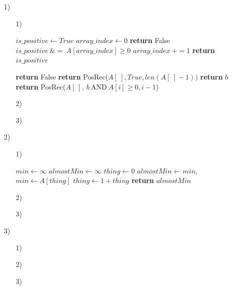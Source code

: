 \documentclass[a4paper, 12pt]{report}
\begin{document}
\begin{enumerate}
\item[1)]{
\begin{enumerate}
    \item[1)]{
        \begin{algorithmic}[1]
        \State $is\_positive\gets True$
        \State $array\_index\gets 0$
            \State \textbf{return} False
        \EndIf
            \State $is\_positive\ \&=\ A[array\_index] \geq 0$
            \State $array\_index\ += 1$
        \EndWhile\label{euclidendwhile}
        \State \textbf{return} $is\_positive$
        \EndProcedure
    \end{algorithmic}
    \begin{algorithmic}[1]
        \State \textbf{return} False
    \EndIf
    \State \textbf{return} PosRec($A[\ ], True, len(A[\ ]-1))$
    \EndProcedure
        \State \textbf{return} $b$
    \Else
        \State \textbf{return} PosRec($A[\ ],\ b\ \text{AND}\ A[i]\geq0, i - 1$)
    \EndIf
    \EndProcedure
\end{algorithmic}
    }
    \item[2)]{}
    \item[3)]{}
\end{enumerate}
}
\item[2)]{
\begin{enumerate}
    \item[1)]{
        \begin{algorithmic}[1]
            \State $min\gets \infty$
            \State $almostMin\gets \infty$
            \State $thing\gets 0$
                    \State $almostMin\gets min$, $min\gets A[thing]$
                \EndIf
                \State $thing\gets 1 + thing$
            \EndWhile\label{euclidendwhile}
            \State \textbf{return} $almostMin$
            \EndProcedure
        \end{algorithmic}
    }
    \item[2)]{}
    \item[3)]{}
\end{enumerate}
}
\item[3)]{
\begin{enumerate}
    \item[1)]{}
    \item[2)]{}
    \item[3)]{}
\end{enumerate}
}
\end{enumerate}
\end{document}
